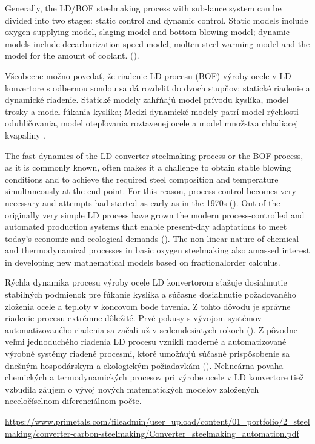 \documentclass[]{tukediphc}
\begin{document}
Generally, the LD/BOF steelmaking process with sub-lance system can be divided into two stages: static control and dynamic control. Static models include oxygen supplying model, slaging model and bottom blowing model; dynamic models include decarburization speed model, molten steel warming model and the model for the amount of coolant. (\cite{Wang2010}).

Všeobecne možno povedať, že riadenie LD procesu (BOF) výroby ocele v LD konvertore s odbernou sondou sa dá rozdeliť do dvoch stupňov: statické riadenie a dynamické riadenie. Statické modely zahŕňajú model prívodu kyslíka, model trosky a model fúkania kyslíka; Medzi dynamické modely patrí model rýchlosti oduhličovania, model otepľovania roztavenej ocele a model množstva chladiacej kvapaliny \cite{Wang2010}.

The fast dynamics of the LD converter steelmaking process or the BOF process, as it is commonly known, often makes it a challenge to obtain stable blowing conditions and to achieve the required steel composition and temperature simultaneously at the end point. For this reason, process control becomes very necessary and attempts had started as early as in the 1970s (\cite{Fritz2005}). Out of the originally very simple LD process have grown the modern process-controlled and automated production systems that enable present-day adaptations to meet today’s economic and ecological demands (\cite{Sarkar2015}). The non-linear nature of chemical and thermodynamical processes in basic oxygen steelmaking also amassed interest in developing new mathematical models based on fractionalorder calculus.

Rýchla dynamika procesu výroby ocele LD konvertorom sťažuje dosiahnutie stabilných podmienok pre fúkanie kyslíka a súčasne dosiahnutie požadovaného zloženia ocele a teploty v koncovom bode tavenia. Z tohto dôvodu je správne riadenie procesu extrémne dôležité. Prvé pokusy s vývojom systémov automatizovaného riadenia sa začali už v sedemdesiatych rokoch (\cite{Fritz2005}). Z pôvodne veľmi jednoduchého riadenia LD procesu vznikli moderné a automatizované výrobné systémy riadené procesmi, ktoré umožňujú súčasné prispôsobenie sa dnešným hospodárskym a ekologickým požiadavkám (\cite{Sarkar2015}). Nelineárna povaha chemických a termodynamických procesov pri výrobe ocele v LD konvertore tiež vzbudila záujem o vývoj nových matematických modelov založených neceločíselnom diferenciálnom počte.

\url{https://www.primetals.com/fileadmin/user_upload/content/01_portfolio/2_steelmaking/converter-carbon-steelmaking/Converter_steelmaking_automation.pdf}
\end{document}
